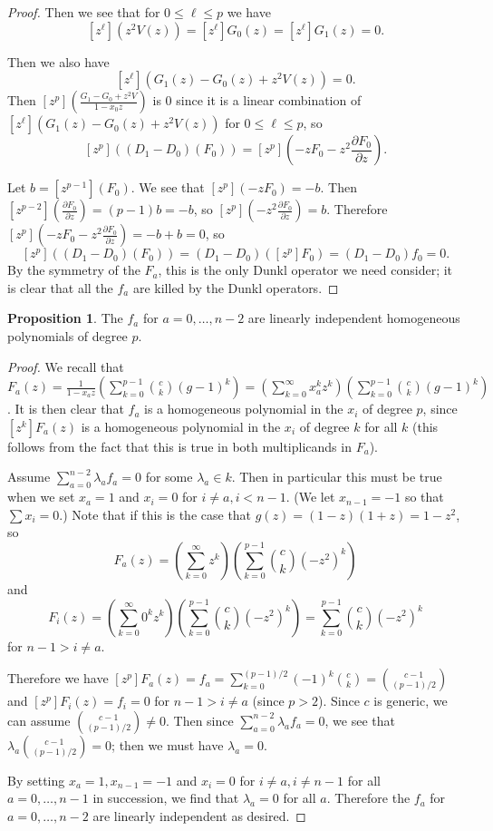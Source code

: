 \documentclass{amsart}
\numberwithin{equation}{section}
\theoremstyle{definition}
\newtheorem{proposition}[equation]{Proposition}
\begin{document}
\begin{proof}
Then we see that for $0 \le \ell \le p$ we have $$[z^\ell](z^2V(z))=[z^\ell]G_0(z)=[z^\ell]G_1(z)=0.$$

Then we also have
 $$[z^\ell](G_1(z)-G_0(z)+z^2V(z))=0.$$ Then $[z^p]\left(\frac{G_1-G_0+z^2V}{1-x_0z}\right)$ is $0$ since it is a linear combination of $[z^\ell](G_1(z)-G_0(z)+z^2V(z))$ for $0 \le \ell \le p$, so $$[z^p]\left((D_1-D_0)(F_0)\right)=[z^p]\left(-zF_0-z^2\frac{\partial F_0}{\partial z}\right).$$

Let $b=[z^{p-1}](F_0)$. We see that $[z^p](-zF_0)=-b$. Then $[z^{p-2}]\left(\frac{\partial F_0}{\partial z}\right)=(p-1)b=-b$, so $[z^p]\left(-z^2\frac{\partial F_0}{\partial z}\right)=b$. Therefore $[z^p]\left(-zF_0-z^2\frac{\partial F_0}{\partial z}\right)=-b+b=0$, so $$[z^p]((D_1-D_0)(F_0))=(D_1-D_0)([z^p]F_0)=(D_1-D_0)f_0=0.$$ By the symmetry of the $F_a$, this is the only Dunkl operator we need consider; it is clear that all the $f_a$ are killed by the Dunkl operators.
\end{proof}

\begin{proposition}\label{prop:linind} The $f_a$ for $a=0,\dots,n-2$ are linearly independent homogeneous polynomials of degree $p$.
\end{proposition} 

\begin{proof} 
We recall that $F_a(z)=\frac{1}{1-x_az}\left(\sum_{k=0}^{p-1} \binom{c}{k} (g-1)^k\right)=\left(\sum_{k=0}^\infty x_a^kz^k\right)\left(\sum_{k=0}^{p-1} \binom{c}{k} (g-1)^k\right)$. It is then clear that $f_a$ is a homogeneous polynomial in the $x_i$ of degree $p$, since $[z^k]F_a(z)$ is a homogeneous polynomial in the $x_i$ of degree $k$ for all $k$ (this follows from the fact that this is true in both multiplicands in $F_a$). 

Assume $\sum_{a=0}^{n-2} \lambda_af_a=0$ for some $\lambda_a \in k$. Then in particular this must be true when we set $x_a=1$ and $x_i=0$ for $i \ne a,i < n-1$. (We let $x_{n-1}=-1$ so that $\sum x_i=0$.) Note that if this is the case that $g(z)=(1-z)(1+z)=1-z^2$, so $$F_a(z)=\left(\sum_{k=0}^\infty z^k\right)\left(\sum_{k=0}^{p-1} \binom{c}{k} (-z^2)^k\right)$$ and $$F_i(z)=\left(\sum_{k=0}^\infty 0^kz^k\right)\left(\sum_{k=0}^{p-1} \binom{c}{k} (-z^2)^k\right)=\sum_{k=0}^{p-1} \binom{c}{k} (-z^2)^k$$ for $n-1>i \ne a$.

Therefore we have $[z^p]F_a(z)=f_a=\sum_{k=0}^{(p-1)/2} (-1)^k\binom{c}{k}=\binom{c-1}{(p-1)/2}$ and $[z^p]F_i(z)=f_i=0$ for $n-1>i \ne a$ (since $p > 2$). Since $c$ is generic, we can assume $\binom{c-1}{(p-1)/2} \ne 0$. Then since $\sum_{a=0}^{n-2} \lambda_af_a=0$, we see that $\lambda_a\binom{c-1}{(p-1)/2}=0$; then we must have $\lambda_a=0$.

By setting $x_a=1,x_{n-1}=-1$ and $x_i=0$ for $i \ne a, i \ne n-1$ for all $a=0,\dots,n-1$ in succession, we find that $\lambda_a=0$ for all $a$. Therefore the $f_a$ for $a=0,\dots,n-2$ are linearly independent as desired.

\end{proof}
\end{document}
